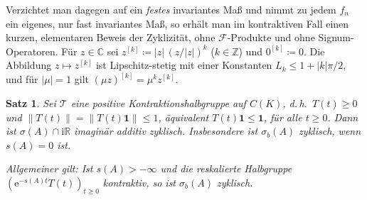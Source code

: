 \documentclass[11pt,a4paper]{article}
\newtheorem{satz}{Satz}
\theoremstyle{remark}
\theoremstyle{definition}
\newcommand{\C}{\mathbb{C}}
\newcommand{\R}{\mathbb{R}}
\newcommand{\Z}{\mathbb{Z}}
\newcommand{\TT}{\mathcal{T}}
\newcommand{\eu}{\mathrm{e}}
\newcommand{\im}{\mathrm{i}}
\begin{document}
Verzichtet man dagegen auf ein \emph{festes} invariantes Maß und nimmt zu jedem $f_n$ ein eigenes, nur fast invariantes Maß, so erhält man im kontraktiven Fall einen kurzen, elementaren Beweis der Zyklizität, ohne $\mathcal{F}$-Produkte und ohne Signum-Operatoren.
Für $z \in \C$ sei $z^{[k]} \coloneqq |z|\,(z/|z|)^k$ ($k \in \Z$) und $0^{[k]} \coloneqq 0$.
Die Abbildung $z \mapsto z^{[k]}$ ist Lipschitz-stetig mit einer Konstanten $L_k \le 1 + |k|\pi/2$, und für $|\mu| = 1$ gilt $(\mu z)^{[k]} = \mu^k z^{[k]}$.

\begin{satz}\label{satz:kontraktiv}
Sei $\TT$ eine positive Kontraktionshalbgruppe auf $C(K)$, d.\,h.\ $T(t) \ge 0$ und $\|T(t)\| = \|T(t)\mathbf{1}\| \le 1$, äquivalent $T(t)\mathbf{1} \le \mathbf{1}$, für alle $t \ge 0$.
Dann ist $\sigma(A) \cap \im\R$ imaginär additiv zyklisch.
Insbesondere ist $\sigma_b(A)$ zyklisch, wenn $s(A) = 0$ ist.

Allgemeiner gilt: Ist $s(A) > -\infty$ und die reskalierte Halbgruppe $(\eu^{-s(A)t}T(t))_{t \ge 0}$ kontraktiv, so ist $\sigma_b(A)$ zyklisch.
\end{satz}
\end{document}
